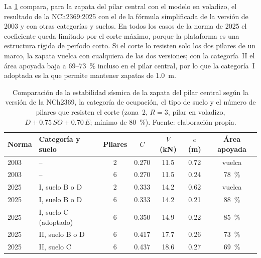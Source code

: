 La \cref{tab:sismo-zapatas} compara, para la zapata del pilar central con el modelo en voladizo, el resultado de la NCh2369:2025 con el de la fórmula simplificada de la versión de 2003 y con otras categorías y suelos.
En todos los casos de la norma de 2025 el coeficiente queda limitado por el corte máximo, porque la plataforma es una estructura rígida de período corto.
Si el corte lo resisten solo los dos pilares de un marco, la zapata vuelca con cualquiera de las dos versiones; con la categoría~II el área apoyada baja a 69--\qty{73}{\percent} incluso en el pilar central, por lo que la categoría~I adoptada es la que permite mantener zapatas de \qty{1.0}{\meter}.

\begin{table}[htbp]
  \centering
  \caption{Comparación de la estabilidad sísmica de la zapata del pilar central según la versión de la NCh2369, la categoría de ocupación, el tipo de suelo y el número de pilares que resisten el corte (zona~2, $R = 3$, pilar en voladizo, $D + \num{0.75}\,SO + \num{0.70}\,E$; mínimo de \qty{80}{\percent}). Fuente: elaboración propia.}
  \label{tab:sismo-zapatas}
  \begin{tabular}{@{}llccccc@{}}
    \toprule
    Norma & Categoría y suelo & Pilares & $C$ & $V$ (\unit{\kilo\newton}) & $e$ (\unit{\meter}) & Área apoyada \\
    \midrule
    2003 & -- & 2 & \num{0.270} & \num{11.5} & \num{0.72} & vuelca \\
    2003 & -- & 6 & \num{0.270} & \num{11.5} & \num{0.24} & \qty{78}{\percent} \\
    2025 & I, suelo B o D & 2 & \num{0.333} & \num{14.2} & \num{0.62} & vuelca \\
    2025 & I, suelo B o D & 6 & \num{0.333} & \num{14.2} & \num{0.21} & \qty{88}{\percent} \\
    2025 & I, suelo C (adoptado) & 6 & \num{0.350} & \num{14.9} & \num{0.22} & \qty{85}{\percent} \\
    2025 & II, suelo B o D & 6 & \num{0.417} & \num{17.7} & \num{0.26} & \qty{73}{\percent} \\
    2025 & II, suelo C & 6 & \num{0.437} & \num{18.6} & \num{0.27} & \qty{69}{\percent} \\
    \bottomrule
  \end{tabular}
\end{table}


